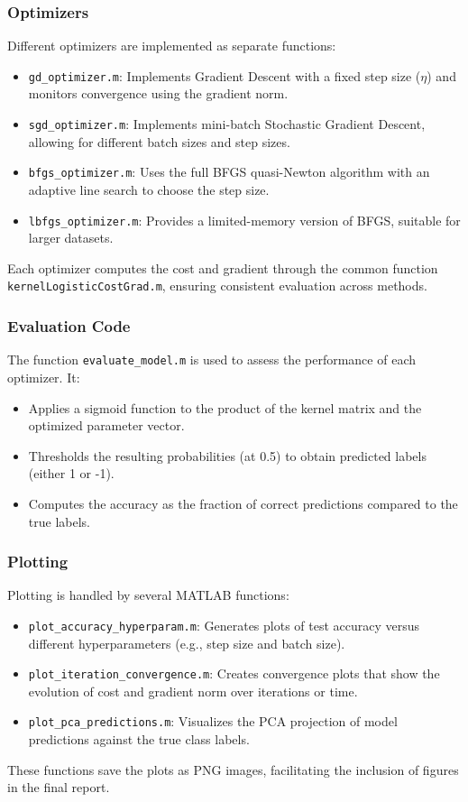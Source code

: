 \documentclass{article}
\begin{document}
\subsubsection{Optimizers}
Different optimizers are implemented as separate functions:
\begin{itemize}
    \item \texttt{gd\_optimizer.m}: Implements Gradient Descent with a fixed step size (\(\eta\)) and monitors convergence using the gradient norm.
    \item \texttt{sgd\_optimizer.m}: Implements mini-batch Stochastic Gradient Descent, allowing for different batch sizes and step sizes.
    \item \texttt{bfgs\_optimizer.m}: Uses the full BFGS quasi-Newton algorithm with an adaptive line search to choose the step size.
    \item \texttt{lbfgs\_optimizer.m}: Provides a limited-memory version of BFGS, suitable for larger datasets.
\end{itemize}
Each optimizer computes the cost and gradient through the common function \texttt{kernelLogisticCostGrad.m}, ensuring consistent evaluation across methods.

\subsubsection{Evaluation Code}
The function \texttt{evaluate\_model.m} is used to assess the performance of each optimizer. It:
\begin{itemize}
    \item Applies a sigmoid function to the product of the kernel matrix and the optimized parameter vector.
    \item Thresholds the resulting probabilities (at 0.5) to obtain predicted labels (either 1 or -1).
    \item Computes the accuracy as the fraction of correct predictions compared to the true labels.
\end{itemize}

\subsubsection{Plotting}
Plotting is handled by several MATLAB functions:
\begin{itemize}
    \item \texttt{plot\_accuracy\_hyperparam.m}: Generates plots of test accuracy versus different hyperparameters (e.g., step size and batch size).
    \item \texttt{plot\_iteration\_convergence.m}: Creates convergence plots that show the evolution of cost and gradient norm over iterations or time.
    \item \texttt{plot\_pca\_predictions.m}: Visualizes the PCA projection of model predictions against the true class labels.
\end{itemize}
These functions save the plots as PNG images, facilitating the inclusion of figures in the final report.
\end{document}
